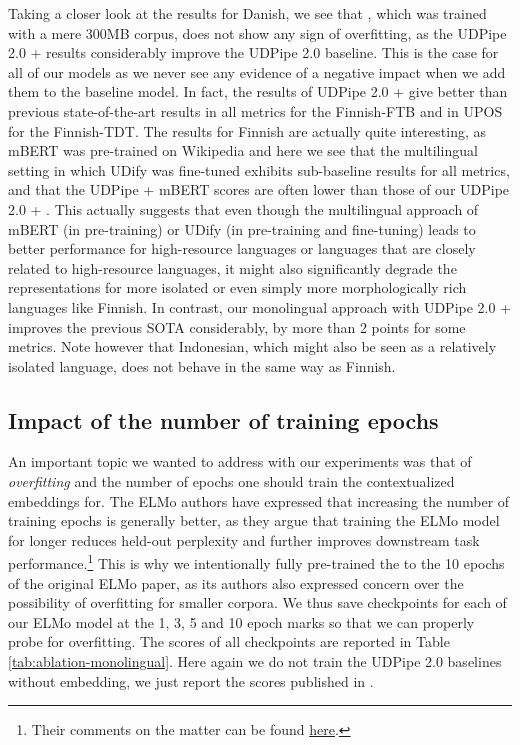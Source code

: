 Taking a closer look at the results for Danish, we see that \elmowiki, which was trained with a mere 300MB corpus, does not show any sign of overfitting, as the UDPipe 2.0 + \elmowiki results considerably improve the UDPipe 2.0 baseline. This is the case for all of our \elmowiki models as we never see any evidence of a negative impact when we add them to the baseline model. In fact, the results of UDPipe 2.0 + \elmowiki give better than previous state-of-the-art results in all metrics for the Finnish-FTB and in UPOS for the Finnish-TDT. The results for Finnish are actually quite interesting, as mBERT was pre-trained on Wikipedia and here we see that the multilingual setting in which UDify was fine-tuned exhibits sub-baseline results for all metrics, and that the UDPipe + mBERT scores are often lower than those of our UDPipe 2.0 + \elmowiki. This actually suggests that even though the multilingual approach of mBERT (in pre-training) or UDify (in pre-training and fine-tuning) leads to better performance for  high-resource languages or languages that are closely related to high-resource languages, it might also significantly degrade the representations for more isolated or even simply more morphologically rich languages like Finnish. In contrast, our monolingual approach with UDPipe 2.0 + \elmooscar improves the previous SOTA considerably, by more than 2 points for some metrics. Note however that Indonesian, which might also be seen as a relatively isolated language, does not behave in the same way as Finnish.

\subsection{Impact of the number of training epochs}

An important topic we wanted to address with our experiments was that of \emph{overfitting} and the number of epochs one should train the contextualized embeddings for. The ELMo authors have expressed that increasing the number of training epochs is generally better, as they argue that training the ELMo model for longer reduces held-out perplexity and further improves downstream task performance.\footnote{Their comments on the matter can be found \href{https://github.com/allenai/bilm-tf/issues/135}{here}.} This is why we intentionally fully pre-trained the \elmowiki to the 10 epochs of the original ELMo paper, as its authors also expressed concern over the possibility of overfitting for smaller corpora. We thus save checkpoints for each of our ELMo model at the 1, 3, 5 and 10 epoch marks so that we can properly probe for overfitting. The scores of all checkpoints are reported in Table \ref{tab:ablation-monolingual}. Here again we do not train the UDPipe 2.0 baselines without embedding, we just report the scores published in \citet{kondratyuk-straka-2019-75}.

